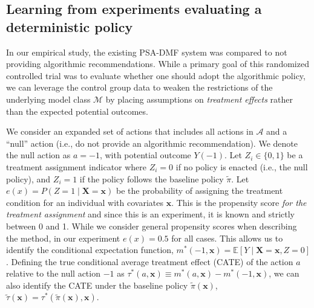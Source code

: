 \documentclass[12pt]{article}
\theoremstyle{definition}
\newcommand{\E}{\ensuremath{\mathbb{E}}}
\newcommand{\bX}{\bm X}
\newcommand{\bx}{\bm x}
\newcommand{\<}{\langle}
\renewcommand{\>}{\rangle}
\begin{document}
\subsection{Learning from experiments evaluating a deterministic policy}
\label{sec:ab_test}

In our empirical study, the existing PSA-DMF system was compared
to not providing algorithmic recommendations.  While a primary goal
of this randomized controlled trial was to evaluate whether one
should adopt the algorithmic policy, we can leverage the control
group data to weaken the restrictions of the underlying model class
$\mathcal{M}$ by placing assumptions on \emph{treatment effects}
rather than the expected potential outcomes.

We consider an expanded set of actions that includes all actions
in $\mathcal{A}$ and a ``null'' action (i.e., do not provide an
algorithmic recommendation).  We denote the null action as $a = -1$,
with potential outcome $Y(-1)$.
Let $Z_i \in \{0,1\}$ be a treatment assignment indicator where
$Z_i = 0$ if no policy is enacted (i.e., the null policy), and
$Z_i = 1$ if the policy follows the baseline policy $\tilde{\pi}$.
Let $e(x) = P(Z = 1 \mid \bX = \bx)$ be the probability of assigning
the treatment condition for an individual with covariates $\bx$.  This
is the propensity score \emph{for the treatment assignment} and since
this is an experiment, it is known and strictly between 0 and 1.
While we consider general propensity scores when describing the
method, in our experiment $e(x) = 0.5$ for all cases.  This allows
us to identify the conditional expectation function,
$m^\ast(-1, \bx) = \E[Y \mid \bX = \bx, Z = 0]$.  Defining the true
conditional average treatment effect (CATE) of the action $a$ relative
to the null action $-1$ as
$\tau^\ast(a, \bx) \equiv m^\ast(a,\bx) - m^\ast(-1,\bx)$, we can also
identify the CATE under the baseline policy $\tilde{\pi}(\bx)$,
$\tilde{\tau}(\bx) = \tau^\ast(\tilde{\pi}(\bx),\bx)$.
\end{document}
